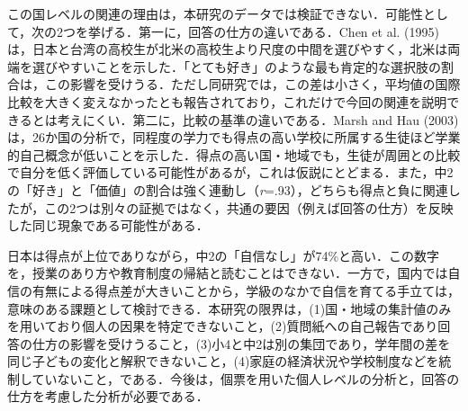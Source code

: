 \documentclass[a4paper,10pt,twocolumn]{ltjsarticle}
\begin{document}
この国レベルの関連の理由は，本研究のデータでは検証できない．可能性として，次の2つを挙げる．第一に，回答の仕方の違いである．Chen et al. (1995)は，日本と台湾の高校生が北米の高校生より尺度の中間を選びやすく，北米は両端を選びやすいことを示した．「とても好き」のような最も肯定的な選択肢の割合は，この影響を受けうる．ただし同研究では，この差は小さく，平均値の国際比較を大きく変えなかったとも報告されており，これだけで今回の関連を説明できるとは考えにくい．第二に，比較の基準の違いである．Marsh and Hau (2003)は，26か国の分析で，同程度の学力でも得点の高い学校に所属する生徒ほど学業的自己概念が低いことを示した．得点の高い国・地域でも，生徒が周囲との比較で自分を低く評価している可能性があるが，これは仮説にとどまる．また，中2の「好き」と「価値」の割合は強く連動し（\textit{r}=.93），どちらも得点と負に関連したが，この2つは別々の証拠ではなく，共通の要因（例えば回答の仕方）を反映した同じ現象である可能性がある．

日本は得点が上位でありながら，中2の「自信なし」が74\%と高い．この数字を，授業のあり方や教育制度の帰結と読むことはできない．一方で，国内では自信の有無による得点差が大きいことから，学級のなかで自信を育てる手立ては，意味のある課題として検討できる．本研究の限界は，(1)国・地域の集計値のみを用いており個人の因果を特定できないこと，(2)質問紙への自己報告であり回答の仕方の影響を受けうること，(3)小4と中2は別の集団であり，学年間の差を同じ子どもの変化と解釈できないこと，(4)家庭の経済状況や学校制度などを統制していないこと，である．今後は，個票を用いた個人レベルの分析と，回答の仕方を考慮した分析が必要である．
\end{document}
